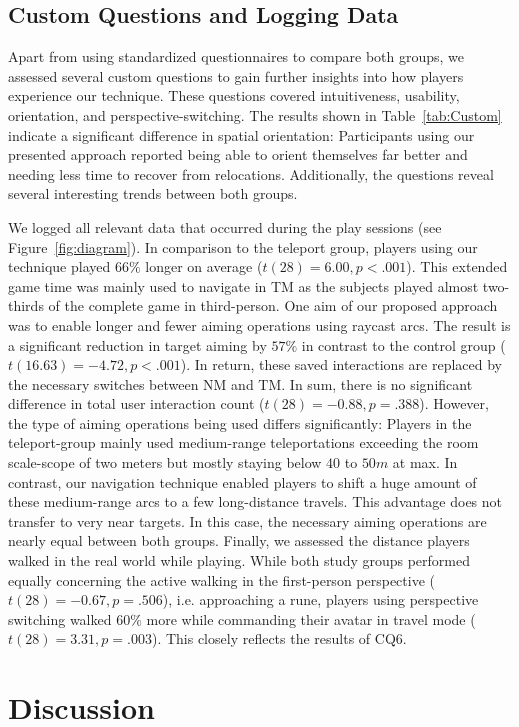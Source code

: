 \documentclass{sigchi}
\begin{document}
\subsection{Custom Questions and Logging Data}
Apart from using standardized questionnaires to compare both groups, we assessed several custom questions to gain further insights into how players experience our technique. These questions covered intuitiveness, usability, orientation, and perspective-switching. The results shown in Table~\ref{tab:Custom} indicate a significant difference in spatial orientation: Participants using our presented approach reported being able to orient themselves far better and needing less time to recover from relocations. Additionally, the questions reveal several interesting trends between both groups.\par
We logged all relevant data that occurred during the play sessions (see Figure~\ref{fig:diagram}). In comparison to the teleport group, players using our technique played $66\%$ longer on average ($t(28)=6.00, p<.001$). This extended game time was mainly used to navigate in TM as the subjects played almost two-thirds of the complete game in third-person. One aim of our proposed approach was to enable longer and fewer aiming operations using raycast arcs. The result is a significant reduction in target aiming by $57\%$ in contrast to the control group ($t(16.63)=-4.72, p<.001$). In return, these saved interactions are replaced by the necessary switches between NM and TM. In sum, there is no significant difference in total user interaction count ($t(28)=-0.88, p=.388$). However, the type of aiming operations being used differs significantly: Players in the teleport-group mainly used medium-range teleportations exceeding the room scale-scope of two meters but mostly staying below $40$ to $50m$ at max. In contrast, our navigation technique enabled players to shift a huge amount of these medium-range arcs to a few long-distance travels. This advantage does not transfer to very near targets. In this case, the necessary aiming operations are nearly equal between both groups. Finally, we assessed the distance players walked in the real world while playing. While both study groups performed equally concerning the active walking in the first-person perspective ($t(28)=-0.67, p=.506$), i.e. approaching a rune, players using perspective switching walked $60\%$ more while commanding their avatar in travel mode ($t(28)=3.31, p=.003$). This closely reflects the results of CQ6.

\section{Discussion}
\end{document}
